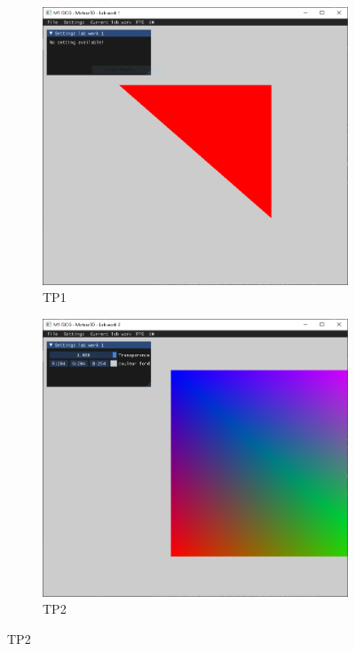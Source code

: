 \documentclass[10pt,a4paper]{article}
\begin{document}
		\begin{figure}[!ht]
			\centering
			\begin{subfigure}[b]{0.32\textwidth}
				\centering
				\includegraphics[width=.9\textwidth]{figures/TP1.png}
				\caption{TP1}\label{fig:TP1}
			\end{subfigure}
			\hfill
			\begin{subfigure}[b]{0.32\textwidth}
				\centering
				\includegraphics[width=.9\textwidth]{figures/TP2.png}
				\caption{TP2}\label{fig:TP2}
			\end{subfigure}
			\hfill

\end{figure}
\end{document}
